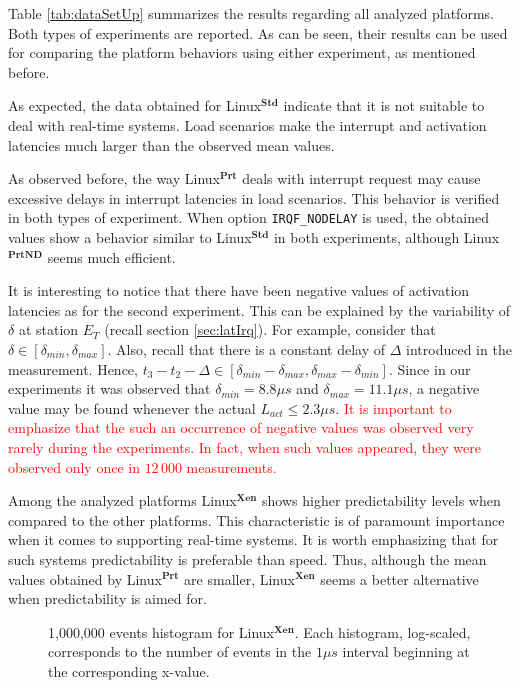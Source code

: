 \documentclass{acm_proc_article-sp}
\newcommand{\col}[1]{\textcolor{red}{#1}}
\newcommand{\cod}[1]{\hspace{0.1cm}\texttt{#1}}
\begin{document}
Table \ref{tab:dataSetUp} summarizes the results regarding all analyzed platforms.
Both types of experiments are reported. As can be seen, their results can be used
for comparing the platform behaviors using either experiment, as mentioned before.

As expected, the data obtained for Linux$^\mathbf{Std}$ indicate that it is not
suitable to deal with real-time systems. Load scenarios make the interrupt and
activation latencies much larger than the observed mean values.

As observed before, the way Linux$^\mathbf{Prt}$ deals with interrupt request may
cause excessive delays in interrupt latencies in load scenarios. This behavior is
verified in both types of experiment. When option \cod{IRQF\_NODELAY} is used, the
obtained values show a behavior similar to Linux$^\mathbf{Std}$ in both experiments,
although Linux$^\mathbf{PrtND}$ seems much efficient.

It is interesting to notice that there have been negative values of activation
latencies as for the second experiment.  This can be explained by the variability of
$\delta$ at station $E_T$ (recall section \ref{sec:latIrq}).  For example, consider
that $\delta \in [\delta_{min},\delta_{max}]$. Also, recall that there is a constant
delay of $\Delta$ introduced in the measurement. Hence, $t_3 - t_2 - \Delta \in
[\delta_{min}-\delta_{max},\delta_{max}-\delta_{min}]$. Since in our experiments it
was observed that $\delta_{min} = 8.8 \mu s$ and $\delta_{max} = 11.1 \mu s$, a
negative value may be found whenever the actual $L_{act} \leq 2.3 \mu s$. \col{It is
important to emphasize that the such an occurrence of negative values was observed
very rarely during the experiments. In fact, when such values appeared, they were
observed only once in $12\,000$ measurements.}

Among the analyzed platforms Linux$^\mathbf{Xen}$ shows higher predictability levels
when compared to the other platforms. This characteristic is of paramount importance
when it comes to sup\-porting real-time systems.  It is worth emphasizing that for
such systems predictability is preferable than speed. Thus, although the mean values
obtained by Linux$^\mathbf{Prt}$ are smaller, Linux$^\mathbf{Xen}$ seems a better
alternative when predic\-tability is aimed for.

\begin{figure}[h!tb]%
 \centering
 \label{fig:histo}%
 {\scalebox{0.64}{}} \hspace{10pt}%
 \caption{1,000,000 events histogram for Linux$^\mathbf{Xen}$. Each histogram, log-scaled,
 corresponds to the number of events in the $1 \mu s$ interval beginning
 at the corresponding x-value.
}
 \label{fig:latIrqAtiv2}%
\end{figure}
\end{document}
